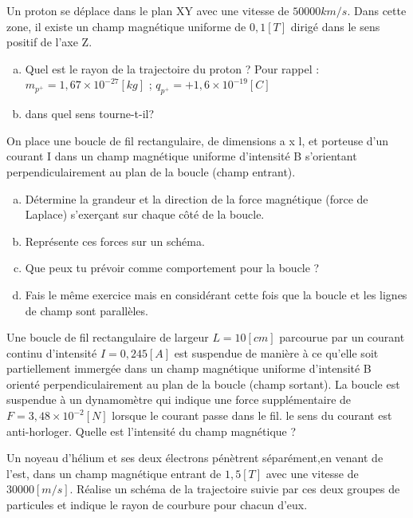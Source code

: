 \begin{exercise}
    Un proton se déplace dans le plan XY avec une vitesse de \(50 000km/s\). Dans cette zone, il existe un champ magnétique uniforme de \(0,1 [T]\) dirigé dans le sens positif de l'axe Z.
    \begin{enumerate}[a)]
        \item Quel est le rayon de la trajectoire du proton ? Pour rappel : \(m_{p^+}=1,67 \times 10^{-27} [kg]\) ; \(q_{p^+}=+1,6 \times 10^{-19} [C]\)
        \item dans quel sens tourne-t-il?
    \end{enumerate}
\end{exercise}

\begin{exercise}
    On place une boucle de fil rectangulaire, de dimensions a x l, et porteuse d'un courant I dans un champ magnétique uniforme d'intensité B s'orientant perpendiculairement au plan de la boucle (champ entrant).
    \begin{enumerate}[a)]
        \item Détermine la grandeur et la direction de la force magnétique (force de Laplace) s'exerçant sur chaque côté de la boucle.
        \item Représente ces forces sur un schéma.
        \item Que peux tu prévoir comme comportement pour la boucle ?
        \item Fais le même exercice mais en considérant cette fois que la boucle et les lignes de champ sont parallèles.
    \end{enumerate}
\end{exercise}

\begin{exercise}
    Une boucle de fil rectangulaire de largeur \(L=10[cm]\) parcourue par un courant continu d'intensité \(I=0,245[A]\) est suspendue de manière à ce qu'elle soit partiellement immergée dans un champ magnétique uniforme d'intensité B orienté perpendiculairement au plan de la boucle (champ sortant). La boucle est suspendue à un dynamomètre qui indique une force supplémentaire de \(F=3,48 \times 10^{-2} [N]\) lorsque le courant passe dans le fil. le sens du courant est anti-horloger. Quelle est l'intensité du champ magnétique ?
\end{exercise}


\begin{exercise}
    Un noyeau d'hélium et ses deux électrons pénètrent séparément,en venant de l'est, dans un champ magnétique entrant de \(1,5[T]\) avec une vitesse de \(30000[m/s]\). Réalise un schéma de la trajectoire suivie par ces deux groupes de particules et indique le rayon de courbure pour chacun d'eux.
\end{exercise}

